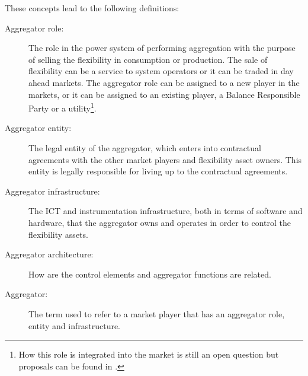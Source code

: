 These concepts lead to the following definitions:
\begin{description}
	\item[Aggregator role:] The role in the power system of performing aggregation with the purpose of selling the flexibility in consumption or production. The sale of flexibility can be a service to system operators or it can be traded in day ahead markets. The aggregator role can be assigned to a new player in the markets, or it can be assigned to an existing player, \eg a Balance Responsible Party or a utility\footnote{How this role is integrated into the market is still an open question but proposals can be found in \cite{usef2015,heussen2013a}.}.
	\item[Aggregator entity:] The legal entity of the aggregator, which enters into contractual agreements with the other market players and flexibility asset owners. This entity is legally responsible for living up to the contractual agreements.
	\item[Aggregator infrastructure:] The ICT and instrumentation infrastructure, both in terms of software and hardware, that the aggregator owns and operates in order to control the flexibility assets.%
	\item[Aggregator architecture:] How are the control elements and aggregator functions are related.%
	\item[Aggregator:] The term used to refer to a market player that has an aggregator role, entity and infrastructure.
\end{description}

